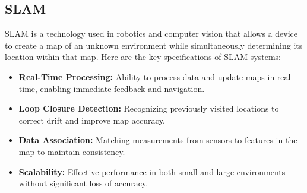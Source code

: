 \subsection{\fontsize{14}{16} SLAM}
{
	\fontsize{12}{14}
	SLAM is a technology used in robotics and computer vision that allows a device to create a map of an unknown environment while simultaneously determining its location within that map. Here are the key specifications of SLAM systems:
	\begin{itemize}
		\item \textbf{Real-Time Processing:} Ability to process data and update maps in real-time, enabling
		immediate feedback and navigation.
		\item \textbf{Loop Closure Detection:} Recognizing previously visited locations to correct drift and
		improve map accuracy.
		\item \textbf{Data Association:} Matching measurements from sensors to features in the map to
		maintain consistency.
		\item \textbf{Scalability:} Effective performance in both small and large environments without
		significant loss of accuracy.
	\end{itemize}
}

